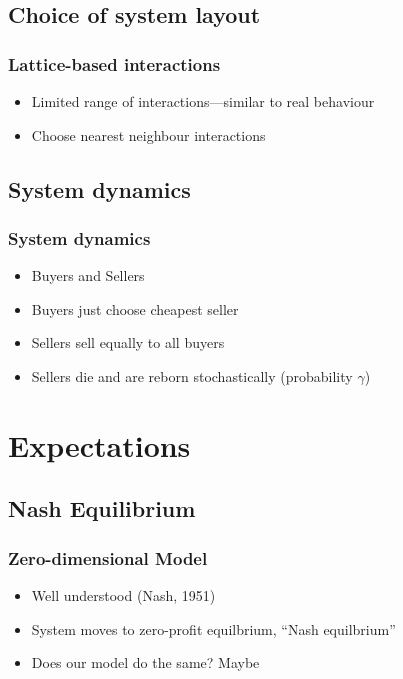 \documentclass{beamer}
\begin{document}
\subsection{Choice of system layout}
\frame
{
  \frametitle{Lattice-based interactions}
  \begin{itemize}
    \setlength{\itemsep}{1\baselineskip}
  \item<1-> Limited range of interactions---similar to real behaviour
  \item<2-> Choose nearest neighbour interactions
  \end{itemize}
  \begin{center}
  \end{center}
}

\subsection{System dynamics}
\frame
{
  \frametitle{System dynamics}
  \begin{itemize}
    \setlength{\itemsep}{\baselineskip}
  \item<1-> Buyers and Sellers
  \item<2-> Buyers just choose cheapest seller
  \item<3-> Sellers sell equally to all buyers
  \item<4-> Sellers die and are reborn stochastically
    (probability $\gamma$)
  \end{itemize}
}

\section{Expectations}

\subsection{Nash Equilibrium}
\frame
{
  \frametitle{Zero-dimensional Model}
  \begin{itemize}
    \setlength{\itemsep}{\baselineskip}
  \item<1-> Well understood (Nash, 1951)
  \item<2-> System moves to zero-profit equilbrium, ``Nash
    equilbrium''
  \item<3-> Does our model do the same?  Maybe
  \end{itemize}
}
\end{document}
